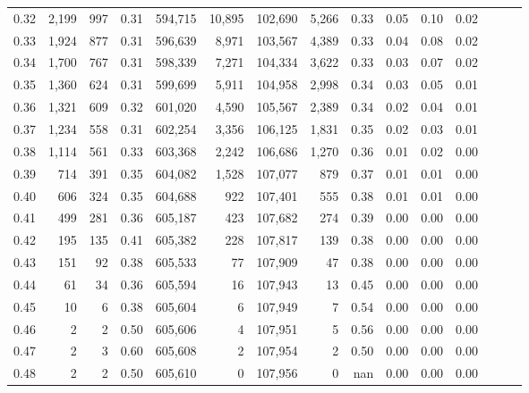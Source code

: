 \begin{tabular}{rrrrrrrrrrrrrrr}
0.32 &   2,199 &    997 &  0.31 &  594,715 &   10,895 &  102,690 &    5,266 &  0.33 &  0.05 &  0.10 &      0.02 \\
0.33 &   1,924 &    877 &  0.31 &  596,639 &    8,971 &  103,567 &    4,389 &  0.33 &  0.04 &  0.08 &      0.02 \\
0.34 &   1,700 &    767 &  0.31 &  598,339 &    7,271 &  104,334 &    3,622 &  0.33 &  0.03 &  0.07 &      0.02 \\
0.35 &   1,360 &    624 &  0.31 &  599,699 &    5,911 &  104,958 &    2,998 &  0.34 &  0.03 &  0.05 &      0.01 \\
0.36 &   1,321 &    609 &  0.32 &  601,020 &    4,590 &  105,567 &    2,389 &  0.34 &  0.02 &  0.04 &      0.01 \\
0.37 &   1,234 &    558 &  0.31 &  602,254 &    3,356 &  106,125 &    1,831 &  0.35 &  0.02 &  0.03 &      0.01 \\
0.38 &   1,114 &    561 &  0.33 &  603,368 &    2,242 &  106,686 &    1,270 &  0.36 &  0.01 &  0.02 &      0.00 \\
0.39 &     714 &    391 &  0.35 &  604,082 &    1,528 &  107,077 &      879 &  0.37 &  0.01 &  0.01 &      0.00 \\
0.40 &     606 &    324 &  0.35 &  604,688 &      922 &  107,401 &      555 &  0.38 &  0.01 &  0.01 &      0.00 \\
0.41 &     499 &    281 &  0.36 &  605,187 &      423 &  107,682 &      274 &  0.39 &  0.00 &  0.00 &      0.00 \\
0.42 &     195 &    135 &  0.41 &  605,382 &      228 &  107,817 &      139 &  0.38 &  0.00 &  0.00 &      0.00 \\
0.43 &     151 &     92 &  0.38 &  605,533 &       77 &  107,909 &       47 &  0.38 &  0.00 &  0.00 &      0.00 \\
0.44 &      61 &     34 &  0.36 &  605,594 &       16 &  107,943 &       13 &  0.45 &  0.00 &  0.00 &      0.00 \\
0.45 &      10 &      6 &  0.38 &  605,604 &        6 &  107,949 &        7 &  0.54 &  0.00 &  0.00 &      0.00 \\
0.46 &       2 &      2 &  0.50 &  605,606 &        4 &  107,951 &        5 &  0.56 &  0.00 &  0.00 &      0.00 \\
0.47 &       2 &      3 &  0.60 &  605,608 &        2 &  107,954 &        2 &  0.50 &  0.00 &  0.00 &      0.00 \\
0.48 &       2 &      2 &  0.50 &  605,610 &        0 &  107,956 &        0 &   nan &  0.00 &  0.00 &      0.00 \\

\end{tabular}
